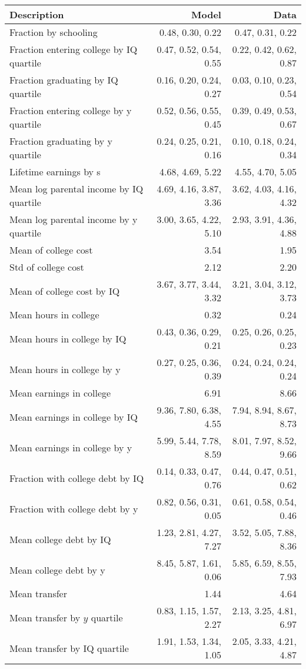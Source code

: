 \begin{tabular}{lrr}
\hline
Description & Model  & Data  \\
\hline
Fraction by schooling & 0.48, 0.30, 0.22  & 0.47, 0.31, 0.22  \\
Fraction entering college by IQ quartile & 0.47, 0.52, 0.54, 0.55  & 0.22, 0.42, 0.62, 0.87  \\
Fraction graduating by IQ quartile & 0.16, 0.20, 0.24, 0.27  & 0.03, 0.10, 0.23, 0.54  \\
Fraction entering college by y quartile & 0.52, 0.56, 0.55, 0.45  & 0.39, 0.49, 0.53, 0.67  \\
Fraction graduating by y quartile & 0.24, 0.25, 0.21, 0.16  & 0.10, 0.18, 0.24, 0.34  \\
Lifetime earnings by s & 4.68, 4.69, 5.22  & 4.55, 4.70, 5.05  \\
Mean log parental income by IQ quartile & 4.69, 4.16, 3.87, 3.36  & 3.62, 4.03, 4.16, 4.32  \\
Mean log parental income by y quartile & 3.00, 3.65, 4.22, 5.10  & 2.93, 3.91, 4.36, 4.88  \\
Mean of college cost & 3.54  & 1.95  \\
Std of college cost & 2.12  & 2.20  \\
Mean of college cost by IQ & 3.67, 3.77, 3.44, 3.32  & 3.21, 3.04, 3.12, 3.73  \\
Mean hours in college & 0.32  & 0.24  \\
Mean hours in college by IQ & 0.43, 0.36, 0.29, 0.21  & 0.25, 0.26, 0.25, 0.23  \\
Mean hours in college by y & 0.27, 0.25, 0.36, 0.39  & 0.24, 0.24, 0.24, 0.24  \\
Mean earnings in college & 6.91  & 8.66  \\
Mean earnings in college by IQ & 9.36, 7.80, 6.38, 4.55  & 7.94, 8.94, 8.67, 8.73  \\
Mean earnings in college by y & 5.99, 5.44, 7.78, 8.59  & 8.01, 7.97, 8.52, 9.66  \\
Fraction with college debt by IQ & 0.14, 0.33, 0.47, 0.76  & 0.44, 0.47, 0.51, 0.62  \\
Fraction with college debt by y & 0.82, 0.56, 0.31, 0.05  & 0.61, 0.58, 0.54, 0.46  \\
Mean college debt by IQ & 1.23, 2.81, 4.27, 7.27  & 3.52, 5.05, 7.88, 8.36  \\
Mean college debt by y & 8.45, 5.87, 1.61, 0.06  & 5.85, 6.59, 8.55, 7.93  \\
Mean transfer & 1.44  & 4.64  \\
Mean transfer by $y$ quartile & 0.83, 1.15, 1.57, 2.27  & 2.13, 3.25, 4.81, 6.97  \\
Mean transfer by IQ quartile & 1.91, 1.53, 1.34, 1.05  & 2.05, 3.33, 4.21, 4.87  \\
\hline
\end{tabular}%
